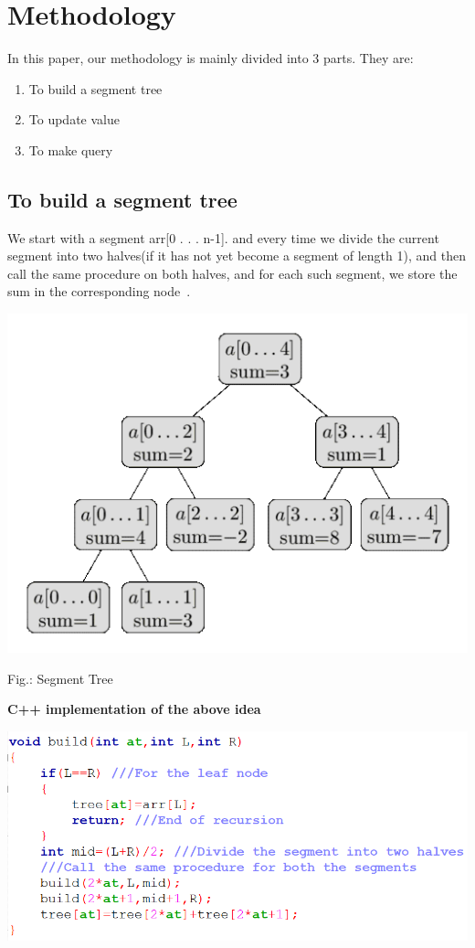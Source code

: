 \documentclass[conference,column]{IEEEtran}
\begin{document}
\section{Methodology}

In this paper, our methodology is mainly divided into 3 parts. They are:
\begin{enumerate}
\item To build a segment tree
\item To update value
\item To make query
\end{enumerate}

\subsection{\textbf{To build a segment tree}}


We start with a segment arr[0 . . . n-1]. and every time we divide the current segment into two halves(if it has not yet become a segment of length 1), and then call the same procedure on both halves, and for each such segment, we store the sum in the corresponding node~\cite{typee}. 


\begin{center}
\includegraphics[scale=0.60]{1.png}
\end{center}
\begin{center}
Fig.: Segment Tree
\end{center}



\textbf{C++ implementation of the above idea}
\begin{center}
\includegraphics[scale=0.60]{2.png}
\end{center}
\end{document}
